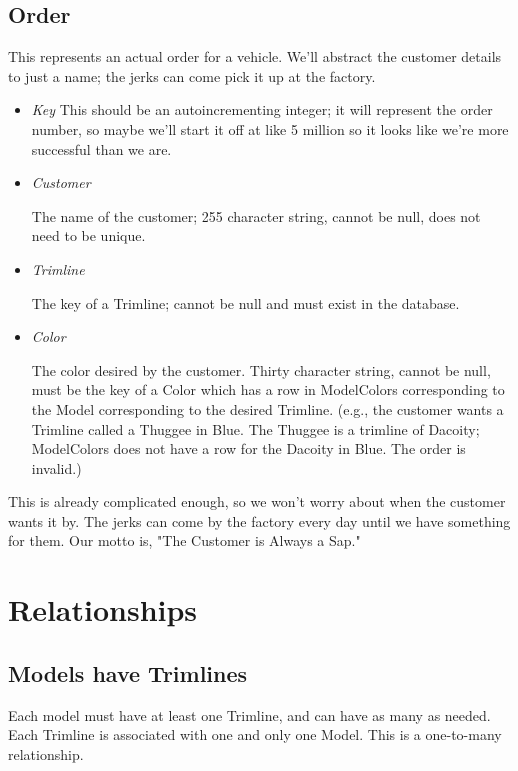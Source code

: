 \documentclass[11pt,letterpaper,oneside]{amsart}
\begin{document}
\subsection*{Order}

This represents an actual order for a vehicle.  We'll abstract the customer details to just a name; the jerks can come pick it up at the factory.

\begin{itemize}

\item \emph{Key}
	This should be an autoincrementing integer; it will represent the order number, so maybe we'll start it off at like 5 million so it looks like we're more successful than we are.

\item \emph{Customer}

	The name of the customer; 255 character string, cannot be null, does not need to be unique.
	
\item \emph{Trimline}
	
	The key of a Trimline; cannot be null and must exist in the database.
	
\item \emph{Color}

	The color desired by the customer.  Thirty character string, cannot be null, must be the key of a Color which has a row in ModelColors corresponding to the Model corresponding to the desired Trimline.  (e.g., the customer wants a Trimline called a Thuggee in Blue.  The Thuggee is a trimline of Dacoity; ModelColors does not have a row for the Dacoity in Blue.  The order is invalid.)
	
\end{itemize}

This is already complicated enough, so we won't worry about when the customer wants it by.  The jerks can come by the factory every day until we have something for them.  Our motto is, "The Customer is Always a Sap."

\section*{Relationships}

\subsection*{Models have Trimlines}

Each model must have at least one Trimline, and can have as many as needed.  Each Trimline is associated with one and only one Model. This is a one-to-many relationship.
\end{document}
